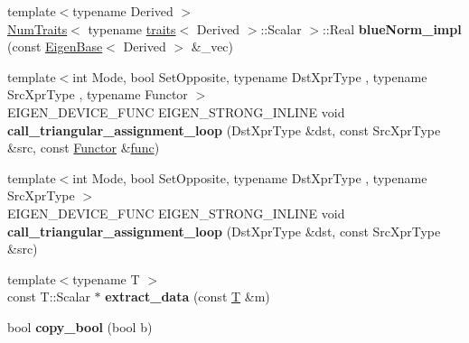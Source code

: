 \begin{DoxyCompactItemize}
\item 
\mbox{\label{namespace_eigen_1_1internal_a48e1e3fe2b8f8c1a91fa40f45a53f763}} 
{\footnotesize template$<$typename Derived $>$ }\\\hyperlink{group___core___module_struct_eigen_1_1_num_traits}{Num\+Traits}$<$ typename \hyperlink{struct_eigen_1_1internal_1_1traits}{traits}$<$ Derived $>$\+::Scalar $>$\+::Real {\bfseries blue\+Norm\+\_\+impl} (const \hyperlink{group___core___module_struct_eigen_1_1_eigen_base}{Eigen\+Base}$<$ Derived $>$ \&\+\_\+vec)
\item 
\mbox{\label{namespace_eigen_1_1internal_aaea39ddd26b75a6b9c90b9244d8e1e64}} 
{\footnotesize template$<$int Mode, bool Set\+Opposite, typename Dst\+Xpr\+Type , typename Src\+Xpr\+Type , typename Functor $>$ }\\E\+I\+G\+E\+N\+\_\+\+D\+E\+V\+I\+C\+E\+\_\+\+F\+U\+NC E\+I\+G\+E\+N\+\_\+\+S\+T\+R\+O\+N\+G\+\_\+\+I\+N\+L\+I\+NE void {\bfseries call\+\_\+triangular\+\_\+assignment\+\_\+loop} (Dst\+Xpr\+Type \&dst, const Src\+Xpr\+Type \&src, const \hyperlink{struct_functor}{Functor} \&\hyperlink{structfunc}{func})
\item 
\mbox{\label{namespace_eigen_1_1internal_ae29ded77dc40c5e1e1e1fbe3bd1492a2}} 
{\footnotesize template$<$int Mode, bool Set\+Opposite, typename Dst\+Xpr\+Type , typename Src\+Xpr\+Type $>$ }\\E\+I\+G\+E\+N\+\_\+\+D\+E\+V\+I\+C\+E\+\_\+\+F\+U\+NC E\+I\+G\+E\+N\+\_\+\+S\+T\+R\+O\+N\+G\+\_\+\+I\+N\+L\+I\+NE void {\bfseries call\+\_\+triangular\+\_\+assignment\+\_\+loop} (Dst\+Xpr\+Type \&dst, const Src\+Xpr\+Type \&src)
\item 
\mbox{\label{namespace_eigen_1_1internal_a9023589ab2cb199e9b9216cb94b0310e}} 
{\footnotesize template$<$typename T $>$ }\\const T\+::\+Scalar $\ast$ {\bfseries extract\+\_\+data} (const \hyperlink{group___sparse_core___module}{T} \&m)
\item 
\mbox{\label{namespace_eigen_1_1internal_a6eba203a81c5888c5934ba70ceb0d22c}} 
bool {\bfseries copy\+\_\+bool} (bool b)
\item 
\mbox{\label{namespace_eigen_1_1internal_aa4a0b9ae1d91131465d7a48e43014aee}} 

\end{DoxyCompactItemize}
